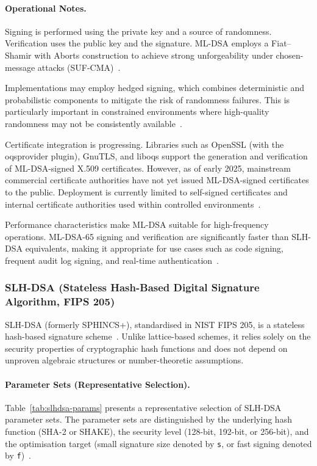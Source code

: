 \documentclass[12pt,a4paper]{article}
\begin{document}
\paragraph{Operational Notes.}
Signing is performed using the private key and a source of randomness. Verification uses the public key and the signature. ML-DSA employs a Fiat–Shamir with Aborts construction to achieve strong unforgeability under chosen-message attacks (SUF-CMA)~\cite{nist-fips-204-2024}.

Implementations may employ hedged signing, which combines deterministic and probabilistic components to mitigate the risk of randomness failures. This is particularly important in constrained environments where high-quality randomness may not be consistently available~\cite{nist-fips-204-2024}.

Certificate integration is progressing. Libraries such as OpenSSL (with the oqsprovider plugin), GnuTLS, and liboqs support the generation and verification of ML-DSA-signed X.509 certificates. However, as of early 2025, mainstream commercial certificate authorities have not yet issued ML-DSA-signed certificates to the public. Deployment is currently limited to self-signed certificates and internal certificate authorities used within controlled environments~\cite{digicert-pqc-progress-2024,ietf-lamps-mldsa-certs-2024}.

Performance characteristics make ML-DSA suitable for high-frequency operations. ML-DSA-65 signing and verification are significantly faster than SLH-DSA equivalents, making it appropriate for use cases such as code signing, frequent audit log signing, and real-time authentication~\cite{nist-fips-204-2024}.

\subsubsection{SLH-DSA (Stateless Hash-Based Digital Signature Algorithm, FIPS 205)}

SLH-DSA (formerly SPHINCS+), standardised in NIST FIPS 205, is a stateless hash-based signature scheme~\cite{nist-fips-205-2024}. Unlike lattice-based schemes, it relies solely on the security properties of cryptographic hash functions and does not depend on unproven algebraic structures or number-theoretic assumptions.

\paragraph{Parameter Sets (Representative Selection).}
Table~\ref{tab:slhdsa-params} presents a representative selection of SLH-DSA parameter sets. The parameter sets are distinguished by the underlying hash function (SHA-2 or SHAKE), the security level (128-bit, 192-bit, or 256-bit), and the optimisation target (small signature size denoted by \texttt{s}, or fast signing denoted by \texttt{f})~\cite{nist-fips-205-2024}.
\end{document}
